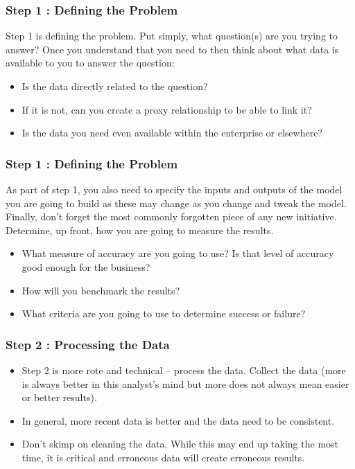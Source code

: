 \documentclass[PredictiveAnalytics101.tex]{subfiles}
\begin{document}
\begin{frame}
\frametitle{Step 1 : Defining the Problem}
\Large
Step 1 is defining the problem. Put simply, what question(s) are you trying to answer? Once you
understand that you need to then think about what data is available to you to answer the question:

\begin{itemize}
\item Is the data directly related to the question?
\item If it is not, can you create a proxy relationship to be able to link it?
\item Is the data you need even available within the enterprise or elsewhere?
\end{itemize}

\end{frame}
\begin{frame}
\frametitle{Step 1 : Defining the Problem}
\Large
As part of step 1, you also need to specify the inputs and outputs of the model you are going to build as
these may change as you change and tweak the model. Finally, don’t forget the most commonly
forgotten piece of any new initiative. Determine, up front, how you are going to measure the results.
\begin{itemize}
\item What measure of accuracy are you going to use? Is that level of accuracy good enough for
the business?
\item How will you benchmark the results?
\item  What criteria are you going to use to determine success or failure?
\end{itemize}
\end{frame}
\begin{frame}
	\frametitle{Step 2 : Processing the Data}
	\Large
	\begin{itemize}
\item Step 2 is more rote and technical – process the data. Collect the data (more is always better in this
analyst’s mind but more does not always mean easier or better results).
\item In general, more recent data is
better and the data need to be consistent. \item Don’t skimp on cleaning the data. While this may end up
taking the most time, it is critical and erroneous data will create erroneous results.
	\end{itemize}

\end{frame}
\end{document}
